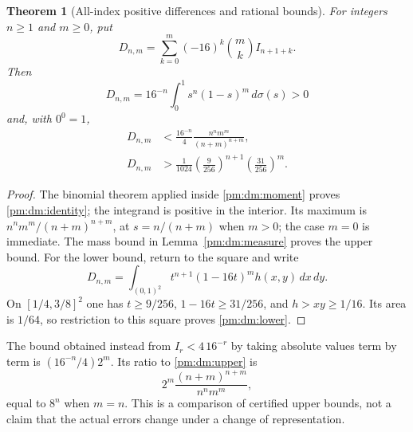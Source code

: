\documentclass[11pt,a4paper]{article}
\newtheorem{theorem}{Theorem}[section]
\theoremstyle{definition}
\theoremstyle{remark}
\numberwithin{equation}{section}
\begin{document}
\begin{theorem}[All-index positive differences and rational bounds]
\label{pm:dm:positive}
For integers $n\ge1$ and $m\ge0$, put
\[
 D_{n,m}=\sum_{k=0}^m(-16)^k\binom mk I_{n+1+k}.
\]
Then
\begin{equation}\label{pm:dm:identity}
 D_{n,m}=16^{-n}\int_0^1s^n(1-s)^m\,d\sigma(s)>0
\end{equation}
and, with $0^0=1$,
\begin{align}
 D_{n,m}&<\frac{16^{-n}}4
       \frac{n^nm^m}{(n+m)^{n+m}},\label{pm:dm:upper}\\
 D_{n,m}&>\frac1{1024}
       \left(\frac9{256}\right)^{n+1}
       \left(\frac{31}{256}\right)^m.\label{pm:dm:lower}
\end{align}
\end{theorem}
\begin{proof}
The binomial theorem applied inside \eqref{pm:dm:moment} proves
\eqref{pm:dm:identity}; the integrand is positive in the interior.  Its maximum
is $n^nm^m/(n+m)^{n+m}$, at $s=n/(n+m)$ when $m>0$; the case $m=0$
is immediate.  The mass bound in Lemma~\ref{pm:dm:measure} proves the upper
bound.  For the lower bound, return to the square and write
\[
 D_{n,m}=\int_{(0,1)^2}t^{n+1}(1-16t)^m h(x,y)\,dx\,dy.
\]
On $[1/4,3/8]^2$ one has $t\ge9/256$,
$1-16t\ge31/256$, and $h>xy\ge1/16$.  Its area is $1/64$,
so restriction to this square proves \eqref{pm:dm:lower}.
\end{proof}

The bound obtained instead from $I_r<4\,16^{-r}$ by taking absolute
values term by term is $(16^{-n}/4)2^m$.  Its ratio to
\eqref{pm:dm:upper} is
\[
 2^m\frac{(n+m)^{n+m}}{n^nm^m},
\]
equal to $8^n$ when $m=n$.  This is a comparison of certified upper bounds,
not a claim that the actual errors change under a change of representation.
\end{document}
